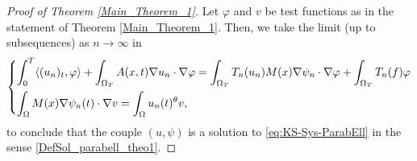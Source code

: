 \documentclass{amsart}
\numberwithin{equation}{section}
\def\io{\int_\Omega}
\def\ioT{\int_{\Omega_T}}
\begin{document}
\begin{proof}[Proof of Theorem \ref{Main_Theorem_1}]
    Let $\varphi$ and $v$ be test functions as in the statement of Theorem \ref{Main_Theorem_1}. Then, we take the limit (up to subsequences) as $n\to\infty$ in 
    \begin{equation}
        \begin{dcases}
                \int_0^T \langle (u_n)_t,\varphi\rangle+\ioT A(x,t)\nabla u_n\cdot \nabla \varphi = \ioT T_n(u_n) M(x)\nabla \psi_n\cdot\nabla\varphi + \ioT T_n(f)\varphi\\
                \io M(x)\nabla \psi_n(t)\cdot\nabla v = \io u_n(t)^\theta v,
        \end{dcases}
    \end{equation}
    to conclude that the couple $(u,\psi)$ is a solution to \eqref{eq:KS-Sys-ParabEll} in the sense \eqref{DefSol_parabell_theo1}.
\end{proof}
\end{document}
